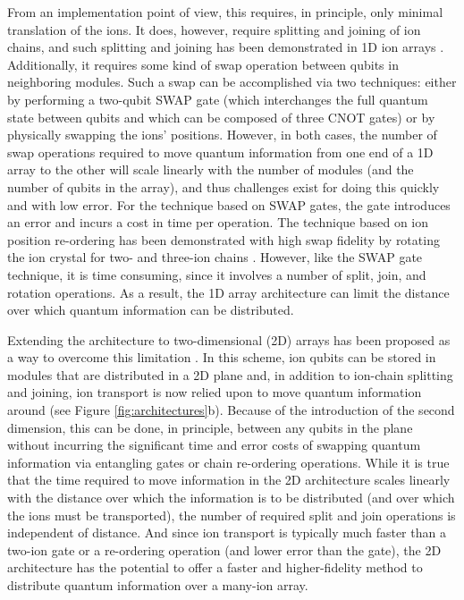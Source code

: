 \documentclass[%
12pt,
 amsmath,amssymb,
]{revtex4-2}
\begin{document}
From an implementation point of view, this requires, in principle, only minimal translation of the ions.  It does, however, require splitting and joining of ion chains, and such splitting and joining has been demonstrated in 1D ion arrays \cite{BowlerDiabaticTransportSplit2012,RusterSplitJoin2014}. Additionally, it requires some kind of swap operation between qubits in neighboring modules.  Such a swap can be accomplished via two techniques: either by performing a two-qubit SWAP gate (which interchanges the full quantum state between qubits and which can be composed of three CNOT gates) or by physically swapping the ions' positions.  However, in both cases, the number of swap operations required to move quantum information from one end of a 1D array to the other will scale linearly with the number of modules (and the number of qubits in the array), and thus challenges exist for doing this quickly and with low error.   For the technique based on SWAP gates, the gate introduces an error and incurs a cost in time per operation.  The technique based on ion position re-ordering has been demonstrated with high swap fidelity by rotating the ion crystal for two- and three-ion chains \cite{KaufmannChainReorder2017}. However, like the SWAP gate technique, it is time consuming, since it involves a number of split, join, and rotation operations.   As a result, the 1D array architecture can limit the distance over which quantum information can be distributed.

Extending the architecture to two-dimensional (2D) arrays has been proposed as a way to overcome this limitation \cite{KielpinskiQCArchitecture2002}.  In this scheme, ion qubits can be stored in modules that are distributed in a 2D plane and, in addition to ion-chain splitting and joining, ion transport is now relied upon to move quantum information around (see Figure \ref{fig:architectures}b).  Because of the introduction of the second dimension, this can be done, in principle, between any qubits in the plane without incurring the significant time and error costs of swapping quantum information via entangling gates or chain re-ordering operations.   While it is true that the time required to move information in the 2D architecture scales linearly with the distance over which the information is to be distributed (and over which the ions must be transported), the number of required split and join operations is independent of distance.  And since ion transport is typically much faster than a two-ion gate or a re-ordering operation (and lower error than the gate), the 2D architecture has the potential to offer a faster and higher-fidelity method to distribute quantum information over a many-ion array.
\end{document}
